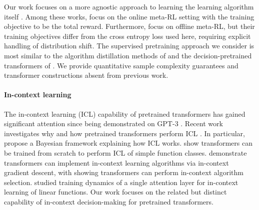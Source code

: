 \documentclass[10pt]{article}
\newcommand{\<}{\left\langle}
\renewcommand{\>}{\right\rangle}
\begin{document}
Our work focuses on a more agnostic approach to learning the learning algorithm itself \citep{wang2016learning, duan2016rl, dorfman2021offline, mitchell2021offline, li2020focal, pong2022offline, laskin2022context, lee2023supervised}. Among these works, \cite{wang2016learning, duan2016rl} focus on the online meta-RL setting with the training objective to be the total reward. Furthermore, \cite{dorfman2021offline, mitchell2021offline, li2020focal, pong2022offline} focus on offline meta-RL, but their training objectives differ from the cross entropy loss used here, requiring explicit handling of distribution shift. The supervised pretraining approach we consider is most similar to the algorithm distillation methods of \cite{laskin2022context} and the decision-pretrained transformers of \cite{lee2023supervised}. We provide quantitative sample complexity guarantees and transformer constructions absent from previous work. 


\paragraph{In-context learning}

The in-context learning (ICL) capability of pretrained transformers has gained significant attention since being demonstrated on GPT-3 \cite{brown2020language}. Recent work investigates why and how pretrained transformers perform ICL \citep{garg2022can, li2023transformers, von2023transformers, akyurek2022learning, xie2021explanation, bai2023transformers, 
zhang2023trained, ahn2023transformers, raventos2023pretraining}. In particular, \cite{xie2021explanation} propose a Bayesian framework explaining how ICL works. \cite{garg2022can} show transformers can be trained from scratch to perform ICL of simple function classes.  \cite{von2023transformers, akyurek2022learning, bai2023transformers} demonstrate transformers can implement in-context learning algorithms via in-context gradient descent, with \cite{bai2023transformers} showing transformers can perform in-context algorithm selection. \cite{zhang2023trained} studied training dynamics of a single attention layer for in-context learning of linear functions. Our work focuses on the related but distinct capability of in-context decision-making for pretrained transformers. 
\end{document}
